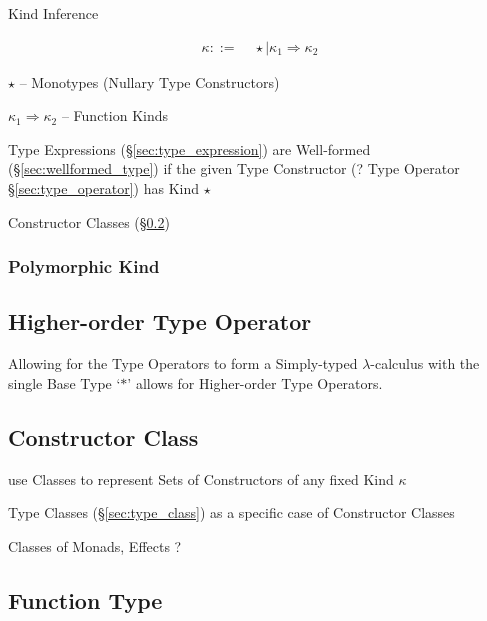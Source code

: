Kind Inference

\begin{align*}
  \kappa ::= &\; \star \mid \kappa_1 \Rightarrow \kappa_2
\end{align*}

$\star$ -- Monotypes (Nullary Type Constructors)

$\kappa_1 \Rightarrow \kappa_2$ -- Function Kinds

Type Expressions (\S\ref{sec:type_expression}) are Well-formed
(\S\ref{sec:wellformed_type}) if the given Type Constructor (? Type
Operator \S\ref{sec:type_operator}) has Kind $\star$

Constructor Classes (\S\ref{sec:constructor_class})



\subsubsection{Polymorphic Kind}\label{sec:polymorphic_kind}



\subsection{Higher-order Type Operator}
\label{sec:higherorder_typeoperator}

Allowing for the Type Operators to form a Simply-typed
$\lambda$-calculus with the single Base Type `$*$' allows for
Higher-order Type Operators.



\subsection{Constructor Class}\label{sec:constructor_class}

use Classes to represent Sets of Constructors of any fixed Kind
$\kappa$

Type Classes (\S\ref{sec:type_class}) as a specific case of
Constructor Classes

Classes of Monads, Effects ?



\subsection{Function Type}\label{sec:function_type}

